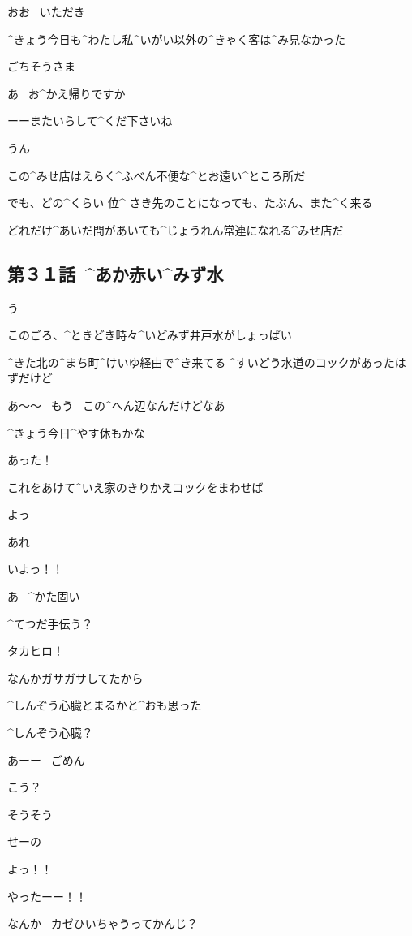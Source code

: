 \N おお
\ いただき

\N ^{きょう}{今日}も^{わたし}{私}^{いがい}{以外}の^{きゃく}{客}は^{み}{見}なかった

\page
\N ごちそうさま

\A あ
\ お^{かえ}{帰}りですか

\A ーーまたいらして^{くだ}{下}さいね

\N うん

\page
\N この^{みせ}{店}はえらく^{ふべん}{不便}な^{とお}{遠}い^{ところ}{所}だ

\N でも、どの^{くらい }{位}^{ さき}{先}のことになっても、たぶん、また^{く}{来}る

\page
\N どれだけ^{あいだ}{間}があいても^{じょうれん}{常連}になれる^{みせ}{店}だ


\subsection{第３１話\ ^{あか}{赤}い^{みず}{水}}

\page[110]
\A う

\page
\A このごろ、^{ときどき}{時々}^{いどみず}{井戸水}がしょっぱい

\A ^{きた}{北}の^{まち}{町}^{けいゆ}{経由}で^{き}{来}てる
^{すいどう}{水道}のコックがあったはずだけど

\page
\A あ〜〜
\ もう
\ この^{へん}{辺}なんだけどなあ

\A ^{きょう}{今日}^{やす}{休}もかな

\page
\A あった！

\A これをあけて^{いえ}{家}のきりかえコックをまわせば

\A よっ

\A あれ

\A いよっ！！

\A あ
\ ^{かた}{固}い

\page
\T ^{てつだ}{手伝}う？

\A タカヒロ！

\T なんかガサガサしてたから

\A ^{しんぞう}{心臓}とまるかと^{おも}{思}った

\A ^{しんぞう}{心臓}？

\T あーー
\ ごめん

\page
\T こう？

\A そうそう

\A せーの

\A よっ！！

\A やったーー！！

\page[117]
\A なんか
\ カゼひいちゃうってかんじ？

